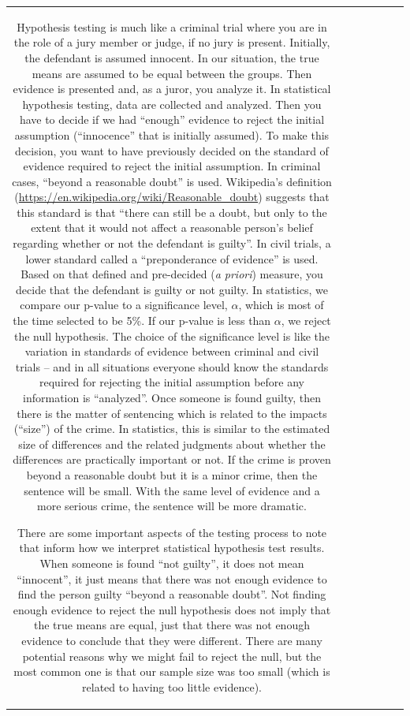 \documentclass[]{book}
\theoremstyle{definition}
\theoremstyle{definition}
\theoremstyle{remark}
\begin{document}
\begin{longtable}[]{@{}ccccccc@{}}
\begin{minipage}[b]{0.10\columnwidth}
Hypothesis testing is much like a criminal trial where you are in the
role of a jury member or judge, if no jury is present. Initially, the
defendant is assumed innocent. In our situation, the true means are
assumed to be equal between the groups. Then evidence is presented and,
as a juror, you analyze it. In statistical hypothesis testing, data are
collected and analyzed. Then you have to decide if we had ``enough''
evidence to reject the initial assumption (``innocence'' that is
initially assumed). To make this decision, you want to have previously
decided on the standard of evidence required to reject the initial
assumption. In criminal cases, ``beyond a reasonable doubt'' is used.
Wikipedia's definition
(\url{https://en.wikipedia.org/wiki/Reasonable_doubt}) suggests that
this standard is that ``there can still be a doubt, but only to the
extent that it would not affect a reasonable person's belief regarding
whether or not the defendant is guilty''. In civil trials, a lower
standard called a ``preponderance of evidence'' is used. Based on that
defined and pre-decided (\emph{a priori}) measure, you decide that the
defendant is guilty or not guilty. In statistics, we compare our p-value
to a significance level, \(\alpha\), which is most of the time selected
to be 5\%. If our p-value is less than \(\alpha\), we reject the null
hypothesis. The choice of the significance level is like the variation
in standards of evidence between criminal and civil trials -- and in all
situations everyone should know the standards required for rejecting the
initial assumption before any information is ``analyzed''. Once someone
is found guilty, then there is the matter of sentencing which is related
to the impacts (``size'') of the crime. In statistics, this is similar
to the estimated size of differences and the related judgments about
whether the differences are practically important or not. If the crime
is proven beyond a reasonable doubt but it is a minor crime, then the
sentence will be small. With the same level of evidence and a more
serious crime, the sentence will be more dramatic.

There are some important aspects of the testing process to note that
inform how we interpret statistical hypothesis test results. When
someone is found ``not guilty'', it does not mean ``innocent'', it just
means that there was not enough evidence to find the person guilty
``beyond a reasonable doubt''. Not finding enough evidence to reject the
null hypothesis does not imply that the true means are equal, just that
there was not enough evidence to conclude that they were different.
There are many potential reasons why we might fail to reject the null,
but the most common one is that our sample size was too small (which is
related to having too little evidence).


\end{minipage}
\end{longtable}
\end{document}
